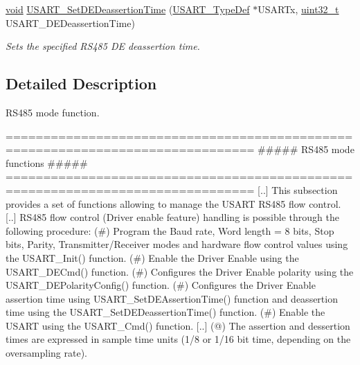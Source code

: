 \begin{DoxyCompactItemize}
\hyperlink{group___n_a_m_e_ga18028b8badbf1ea7e704ccac3c488e82}{void} \hyperlink{group___u_s_a_r_t___group10_ga48de5a42453a760cfe12fd6af32874cc}{U\-S\-A\-R\-T\-\_\-\-Set\-D\-E\-Deassertion\-Time} (\hyperlink{struct_u_s_a_r_t___type_def}{U\-S\-A\-R\-T\-\_\-\-Type\-Def} $\ast$U\-S\-A\-R\-Tx, \hyperlink{stdint_8h_a435d1572bf3f880d55459d9805097f62}{uint32\-\_\-t} U\-S\-A\-R\-T\-\_\-\-D\-E\-Deassertion\-Time)
\begin{DoxyCompactList}\small\item\em Sets the specified R\-S485 D\-E deassertion time. \end{DoxyCompactList}\end{DoxyCompactItemize}


\subsection{Detailed Description}
R\-S485 mode function. \begin{DoxyVerb} ===============================================================================
                        ##### RS485 mode functions #####
 ===============================================================================
    [..] This subsection provides a set of functions allowing to manage the USART
         RS485 flow control.
    [..] RS485 flow control (Driver enable feature) handling is possible through
         the following procedure:
         (#) Program the Baud rate, Word length = 8 bits, Stop bits, Parity, 
             Transmitter/Receiver modes and hardware flow control values using 
             the USART_Init() function.
         (#) Enable the Driver Enable using the USART_DECmd() function.
         (#) Configures the Driver Enable polarity using the USART_DEPolarityConfig()
             function.
         (#) Configures the Driver Enable assertion time using USART_SetDEAssertionTime() 
             function and deassertion time using the USART_SetDEDeassertionTime()
             function.    
         (#) Enable the USART using the USART_Cmd() function.
      [..]  
       (@) The assertion and dessertion times are expressed in sample time units (1/8 or 
            1/16 bit time, depending on the oversampling rate).\end{DoxyVerb}
 


